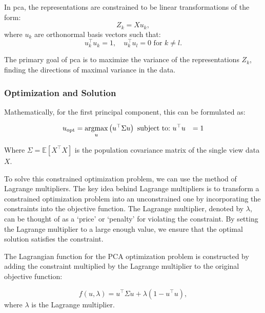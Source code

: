 In \acrshort{pca}, the representations are constrained to be linear transformations of the form:
\begin{equation}
    \label{eq:pca-linear-function-def}
    Z_k = X u_k,
\end{equation}
where $u_k$ are orthonormal basis vectors such that:
\begin{equation}
    \label{eq:pca-orthonormality-constraint}
    u_k^\top u_k = 1, \quad
    u_k^\top u_l = 0 \text{ for } k \neq l.
\end{equation}

The primary goal of \acrshort{pca} is to maximize the variance of the representations \(Z_k\), finding the directions of maximal variance in the data.

\subsubsection{Optimization and Solution}
Mathematically, for the first principal component, this can be formulated as:

\begin{align}
    u_{\text{opt}} & = \underset{u}{\text{argmax}} \left( u^\top \Sigma u \right) \
    \text{subject to:} \notag                                                     \
    u^\top u       & = 1 \notag
\end{align}

Where \(\Sigma = \mathbb{E}[X^\top X]\) is the population covariance matrix of the single view data $X$.

To solve this constrained optimization problem, we can use the method of Lagrange multipliers. The key idea behind Lagrange multipliers is to transform a constrained optimization problem into an unconstrained one by incorporating the constraints into the objective function. The Lagrange multiplier, denoted by $\lambda$, can be thought of as a `price' or `penalty' for violating the constraint. By setting the Lagrange multiplier to a large enough value, we ensure that the optimal solution satisfies the constraint.

The Lagrangian function for the PCA optimization problem is constructed by adding the constraint multiplied by the Lagrange multiplier to the original objective function:

\begin{equation}
    f(u,\lambda) = u^\top \Sigma u + \lambda(1 - u^\top u),
\end{equation}
where \(\lambda\) is the Lagrange multiplier.

